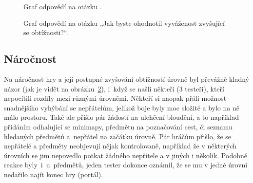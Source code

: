 \begin{figure}[hb]
    \centering
    \caption{Graf odpovědí na otázku .}
    \label{fig:hodnoceni_stabilita}
\end{figure}

\begin{figure}[ht]
    \centering
    \caption{Graf odpovědí na otázku „Jak byste ohodnotil vyváženost zvyšující se obtížnosti?“.}
    \label{fig:hodnoceni_vyvazenost}
\end{figure}

\subsection*{Náročnost}
Na náročnost hry a její postupné zvyšování obtížností úrovně byl převážně kladný názor (jak je vidět na obrázku~\ref{fig:hodnoceni_vyvazenost}), i~když se našli někteří (3 testeři), kteří nepocítili rozdíly mezi různými úrovněmi. Někteří si naopak přáli možnost snadnějšího vyhýbání se nepřátelům, jelikož boje byly moc složité a bylo na ně málo prostoru. Také ale přišlo pár žádostí na ulehčení bloudění, a to například přidáním odhalující se minimapy, předmětu na poznačování cest, či seznamu hledaných předmětů a~nepřátel na začátku úrovně. Pár hráčům přišlo, že se nepřátelé a předměty neobjevují nějak kontrolovaně, například že v některých úrovních se jim nepovedlo potkat žádného nepřítele a v jiných i několik. Podobné reakce byly~i~u~předmětů, jeden tester dokonce oznámil, že se mu v jedné úrovni nedařilo najít konec hry (portál). 

